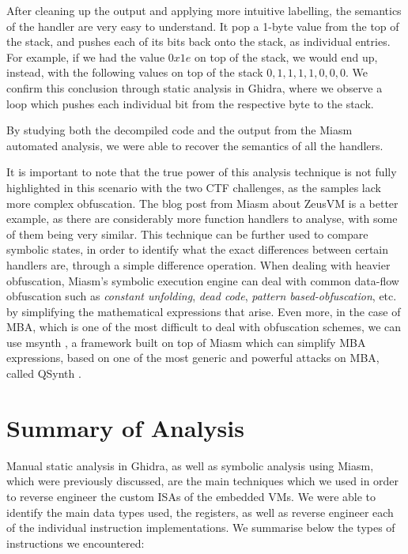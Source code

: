 After cleaning up the output and applying more intuitive labelling, the semantics of the handler are very easy to understand. It pop a 1-byte value from the top of the stack, and pushes each of its bits back onto the stack, as individual entries. For example, if we had the value $0x1e$ on top of the stack, we would end up, instead, with the following values on top of the stack $0, 1, 1, 1, 1, 0, 0, 0$. We confirm this conclusion through static analysis in Ghidra, where we observe a loop which pushes each individual bit from the respective byte to the stack.

By studying both the decompiled code and the output from the Miasm automated analysis, we were able to recover the semantics of all the handlers. 

It is important to note that the true power of this analysis technique is not fully highlighted in this scenario with the two \gls{CTF} challenges, as the samples lack more complex obfuscation. The blog post from Miasm about ZeusVM \cite{zeusvm_miasm} is a better example, as there are considerably more function handlers to analyse, with some of them being very similar. This technique can be further used to compare symbolic states, in order to identify what the exact differences between certain handlers are, through a simple difference operation. When dealing with heavier obfuscation, Miasm's symbolic execution engine can deal with common data-flow obfuscation such as \emph{constant unfolding}, \emph{dead code}, \emph{pattern based-obfuscation}, etc. by simplifying the mathematical expressions that arise. Even more, in the case of \gls{MBA}, which is one of the most difficult to deal with obfuscation schemes, we can use msynth \cite{msynth}, a framework built on top of Miasm which can simplify \gls{MBA} expressions, based on one of the most generic and powerful attacks on \gls{MBA}, called QSynth \cite{qsynth}.

\section{Summary of Analysis}

Manual static analysis in Ghidra, as well as symbolic analysis using Miasm, which were previously discussed, are the main techniques which we used in order to reverse engineer the custom \glspl{ISA} of the embedded \glspl{VM}. We were able to identify the main data types used, the registers, as well as reverse engineer each of the individual instruction implementations. We summarise below the types of instructions we encountered:

